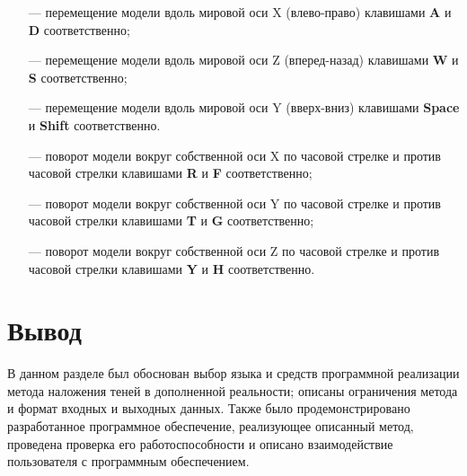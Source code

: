 \begin{itemize}
	\item[---] перемещение модели вдоль мировой оси X (влево-право) клавишами \textbf{A} и \textbf{D} соответственно;
	\item[---] перемещение модели вдоль мировой оси Z (вперед-назад) клавишами \textbf{W} и \textbf{S} соответственно;
	\item[---] перемещение модели вдоль мировой оси Y (вверх-вниз) клавишами \textbf{Space} и \textbf{Shift} соответственно.
	\item[---] поворот модели вокруг собственной оси X по часовой стрелке и против часовой стрелки клавишами \textbf{R} и \textbf{F} соответственно;
	\item[---] поворот модели вокруг собственной оси Y по часовой стрелке и против часовой стрелки клавишами \textbf{T} и \textbf{G} соответственно;
	\item[---] поворот модели вокруг собственной оси Z по часовой стрелке и против часовой стрелки клавишами \textbf{Y} и \textbf{H} соответственно.
\end{itemize}

\section*{Вывод}

В данном разделе был обоснован выбор языка и средств программной реализации метода наложения теней в дополненной реальности; описаны ограничения метода и формат входных и выходных данных. Также было продемонстрировано разработанное программное обеспечение, реализующее описанный метод, проведена проверка его работоспособности и описано взаимодействие пользователя с программным обеспечением.